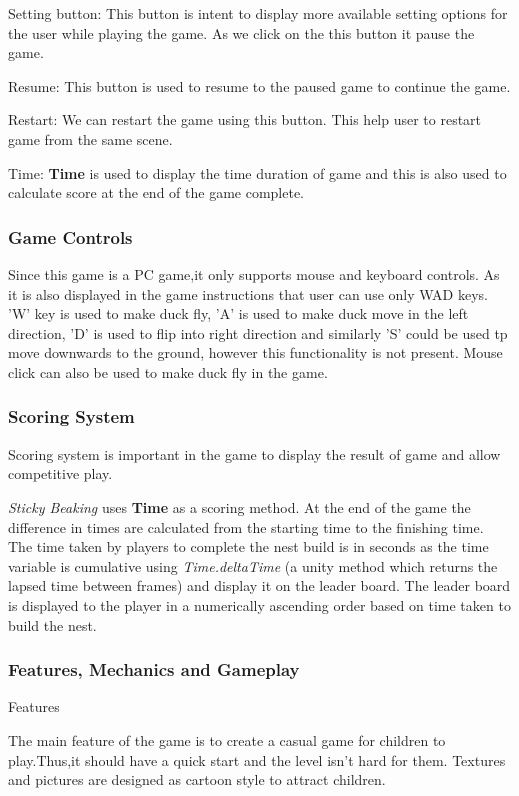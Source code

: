 \documentclass[12pt]{article}
\newcommand{\game}[2]{\textit{#1}}{}
\begin{document}
 Setting button: This button is intent to display more available setting options for the user while playing the game. As we click on the this button it pause the game.
 
 Resume: This button is used to resume to the paused game to continue the game.
 
 Restart: We can restart the game using this button. This help user to restart game from the same scene.
 
 Time: \textbf{Time} is used to display the time duration of game and this is also used to calculate score at the end of the game complete.
 
\subsubsection{Game Controls}

Since this game is a PC game,it only supports mouse and keyboard controls. As it is also displayed in the game instructions that user can use only WAD keys. 'W' key is used to make duck fly, 'A' is used to make duck move in the left direction, 'D' is used to flip into right direction and similarly 'S' could be used tp move downwards to the ground, however this functionality is not present. Mouse click can also be used to make duck fly in the game.


\subsubsection{Scoring System}

Scoring system is important in the game to display the result of game and allow competitive play.

\game{Sticky Beaking}{ } uses \textbf{Time} as a scoring method. At the end of the game the difference in times are calculated from the starting time to the finishing time. The time taken by players to complete the nest build is in seconds as the time variable is cumulative using \emph{Time.deltaTime} (a unity method which returns the lapsed time between frames) and display it on the leader board. The leader board is displayed to the player in a numerically ascending order based on time taken to build the nest.

\subsubsection{Features, Mechanics and Gameplay}
Features

The main feature of the game is to create a casual game for children to play.Thus,it should have a quick start and the level isn't hard for them. Textures and pictures are designed as cartoon style to attract children.  
\end{document}
